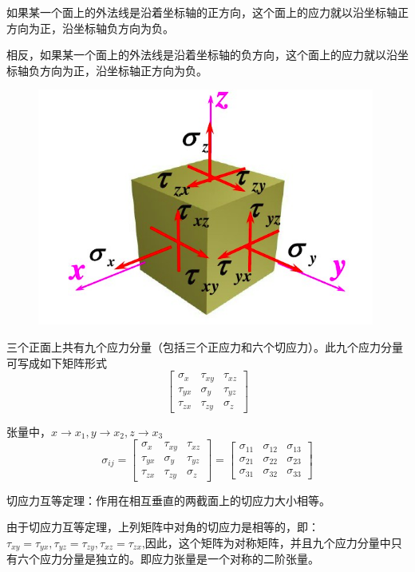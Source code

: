 \documentclass[12pt,a4paper]{article}
\begin{document}
如果某一个面上的外法线是沿着坐标轴的正方向，这个面上的应力就以沿坐标轴正方向为正，沿坐标轴负方向为负。

相反，如果某一个面上的外法线是沿着坐标轴的负方向，这个面上的应力就以沿坐标轴负方向为正，沿坐标轴正方向为负。

\begin{figure}[H]
\centering
\includegraphics[scale=0.5]{./figures/6.png}
\caption{}
\end{figure}

三个正面上共有九个应力分量（包括三个正应力和六个切应力）。此九个应力分量可写成如下矩阵形式
$$
\begin{bmatrix}
\sigma _x & \tau_{xy} & \tau_{xz} \\
\tau_{yx} & \sigma _y & \tau_{yz} \\
\tau_{zx} & \tau_{zy} & \sigma _z
\end{bmatrix}
$$

张量中，$x \to x_1 , y \to x_2 , z \to x_3$
$$
\sigma _{ij} =
\begin{bmatrix}
\sigma _x & \tau_{xy} & \tau_{xz} \\
\tau_{yx} & \sigma _y & \tau_{yz} \\
\tau_{zx} & \tau_{zy} & \sigma _z
\end{bmatrix}=
\begin{bmatrix}
\sigma _{11} & \sigma_{12} & \sigma_{13} \\
\sigma_{21} & \sigma _{22} & \sigma_{23} \\
\sigma_{31} & \sigma_{32} & \sigma_{33}
\end{bmatrix}
$$

切应力互等定理：作用在相互垂直的两截面上的切应力大小相等。

由于切应力互等定理，上列矩阵中对角的切应力是相等的，即：$\tau_{xy}=\tau_{yx}, \tau_{yz}=\tau_{zy}, \tau_{xz}=\tau_{zx}$,因此，这个矩阵为对称矩阵，并且九个应力分量中只有六个应力分量是独立的。即应力张量是一个对称的二阶张量。
\end{document}
